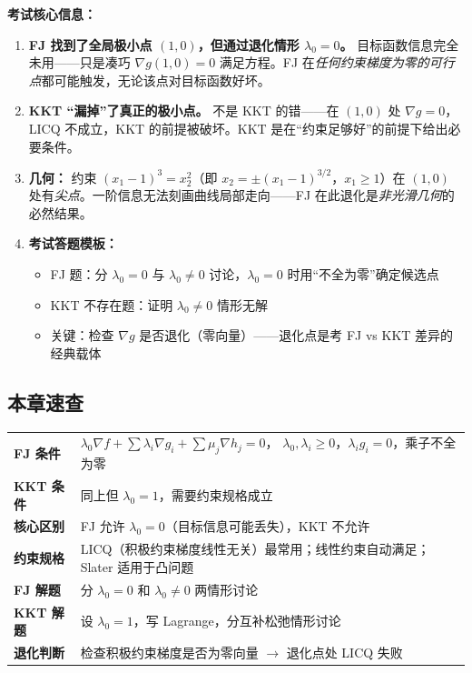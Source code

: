 \begin{notebox}
\textbf{考试核心信息：}

\begin{enumerate}
  \item \textbf{FJ 找到了全局极小点 $(1,0)$，但通过退化情形 $\lambda_0=0$。} 目标函数信息完全未用——只是凑巧 $\nabla g(1,0)=0$ 满足方程。FJ 在\emph{任何约束梯度为零的可行点}都可能触发，无论该点对目标函数好坏。

  \item \textbf{KKT “漏掉”了真正的极小点。} 不是 KKT 的错——在 $(1,0)$ 处 $\nabla g=0$，LICQ 不成立，KKT 的前提被破坏。KKT 是在“约束足够好”的前提下给出必要条件。

  \item \textbf{几何：} 约束 $(x_1-1)^3=x_2^2$（即 $x_2=\pm(x_1-1)^{3/2}$，$x_1\ge 1$）在 $(1,0)$ 处有\emph{尖点}。一阶信息无法刻画曲线局部走向——FJ 在此退化是\emph{非光滑几何}的必然结果。

  \item \textbf{考试答题模板：}
  \begin{itemize}
    \item FJ 题：分 $\lambda_0=0$ 与 $\lambda_0\neq 0$ 讨论，$\lambda_0=0$ 时用“不全为零”确定候选点
    \item KKT 不存在题：证明 $\lambda_0\neq 0$ 情形无解
    \item 关键：检查 $\nabla g$ 是否退化（零向量）——退化点是考 FJ vs KKT 差异的经典载体
  \end{itemize}
\end{enumerate}
\end{notebox}

\clearpage\subsection{本章速查}

{\footnotesize
\begin{tabular}{@{}p{16mm}@{}p{78mm}@{}}
\toprule
\textbf{FJ 条件}
  & $\lambda_0\nabla f + \sum\lambda_i\nabla g_i + \sum\mu_j\nabla h_j = 0$，
    $\lambda_0,\lambda_i\ge0$，$\lambda_i g_i=0$，乘子不全为零 \\
\addlinespace
\textbf{KKT 条件}
  & 同上但 $\lambda_0=1$，需要约束规格成立 \\
\addlinespace
\textbf{核心区别}
  & FJ 允许 $\lambda_0=0$（目标信息可能丢失），KKT 不允许 \\
\addlinespace
\textbf{约束规格}
  & LICQ（积极约束梯度线性无关）最常用；线性约束自动满足；Slater 适用于凸问题 \\
\addlinespace
\textbf{FJ 解题}
  & 分 $\lambda_0=0$ 和 $\lambda_0\neq0$ 两情形讨论 \\
\addlinespace
\textbf{KKT 解题}
  & 设 $\lambda_0=1$，写 Lagrange，分互补松弛情形讨论 \\
\addlinespace
\textbf{退化判断}
  & 检查积极约束梯度是否为零向量 $\to$ 退化点处 LICQ 失败 \\
\bottomrule
\end{tabular}
}
